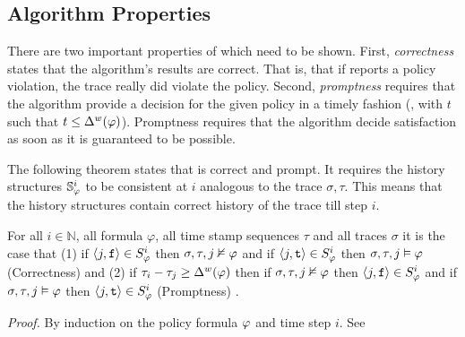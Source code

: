 \subsection{Algorithm Properties}
There are two important properties of \monitor which need to be shown. First, \emph{correctness} states that the algorithm's results are correct. 
That is, that if \monitor reports a policy violation, the trace really did violate the policy. Second, \emph{promptness}  requires that the algorithm 
provide a decision for the given policy in a timely fashion (\ie, with $t$ such that $t\leq \Delta^w(\varphi)$). 
Promptness requires that the algorithm decide satisfaction as soon as it is guaranteed to be possible. 
%

The following theorem states that \monitor is correct and prompt. It requires  the history structures $\mathbb{S}^{i}_{\varphi}$ to be consistent at $i$ analogous to the trace $\sigma,\tau$. 
This means that the history structures contain correct history of the trace till step $i$. %

\begin{theorem}
For all $i \in \mathbb{N}$, all formula $\varphi$, all time stamp sequences $\tau$ and all traces $\sigma$ it is the case that (1) if $\langle j, \mathrm{\texttt{f}} \rangle \in {S}^{i}_{\varphi}$ then $\sigma, \tau, j \nvDash \varphi$ and if $\langle j, \mathrm{\texttt{t}} \rangle \in {S}^{i}_{\varphi}$ then $\sigma, \tau, j \vDash \varphi$ (Correctness) and (2) if $\tau_i - \tau_j \geq \Delta^w(\varphi)$ then if $\sigma, \tau, j \nvDash \varphi$ then $\langle j, \mathrm{\texttt{f}} \rangle \in {S}^{i}_{\varphi}$ and if $\sigma, \tau, j \vDash \varphi$ then $\langle j, \mathrm{\texttt{t}} \rangle \in {S}^{i}_{\varphi}$ (Promptness)
.
\end{theorem}
\textit{Proof.} By  induction on the policy formula $\varphi$ and time step $i$. See \cite{Kane2015} \\

%
